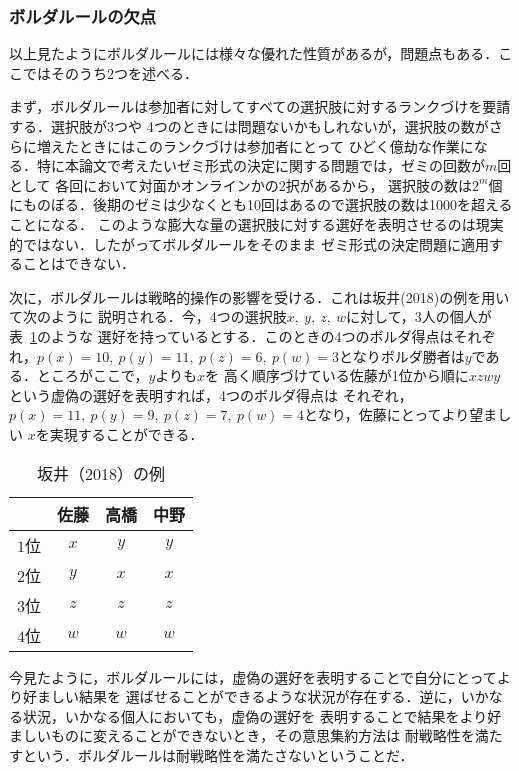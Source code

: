 \documentclass[dvipdfmx]{jsarticle}
\begin{document}
\subsubsection{ボルダルールの欠点}\label{ボルダルールの欠点}
以上見たようにボルダルールには様々な優れた性質があるが，問題点もある．ここではそのうち2つを述べる．

まず，ボルダルールは参加者に対してすべての選択肢に対するランクづけを要請する．選択肢が3つや
4つのときには問題ないかもしれないが，選択肢の数がさらに増えたときにはこのランクづけは参加者にとって
ひどく億劫な作業になる．特に本論文で考えたいゼミ形式の決定に関する問題では，ゼミの回数が$m$回として
各回において対面かオンラインかの2択があるから，
選択肢の数は$2^m$個にものぼる．後期のゼミは少なくとも10回はあるので選択肢の数は1000を超えることになる．
このような膨大な量の選択肢に対する選好を表明させるのは現実的ではない．したがってボルダルールをそのまま
ゼミ形式の決定問題に適用することはできない．

次に，ボルダルールは戦略的操作の影響を受ける．これは坂井(2018)の例を用いて次のように
説明される．今，4つの選択肢$x,\ y,\ z,\ w$に対して，3人の個人が表~\ref{Sakai2018}のような
選好を持っているとする．このときの4つのボルダ得点はそれぞれ，$p(x) = 10,\ p(y) = 11,
\ p(z) = 6, \ p(w) = 3$となりボルダ勝者は$y$である．ところがここで，$y$よりも$x$を
高く順序づけている佐藤が1位から順に$xzwy$という虚偽の選好を表明すれば，4つのボルダ得点は
それぞれ，$p(x) = 11,\ p(y) = 9,\ p(z) = 7, \ p(w) = 4$となり，佐藤にとってより望ましい
$x$を実現することができる．

\begin{table}[h]
  \caption{坂井（2018）の例}\label{Sakai2018}
  \begin{center}
    \begin{tabular}{c|c|c|c} \hline
        & 佐藤 & 高橋 & 中野 \\ \hline
      $1$位 & $x$ & $y$ & $y$ \\
      $2$位 & $y$ & $x$ & $x$ \\
      $3$位 & $z$ & $z$ & $z$ \\
      $4$位 & $w$ & $w$ & $w$ \\ \hline
    \end{tabular}
  \end{center}
\end{table}

今見たように，ボルダルールには，虚偽の選好を表明することで自分にとってより好ましい結果を
選ばせることができるような状況が存在する．逆に，いかなる状況，いかなる個人においても，虚偽の選好を
表明することで結果をより好ましいものに変えることができないとき，その意思集約方法は
耐戦略性を満たすという．ボルダルールは耐戦略性を満たさないということだ．
\end{document}
